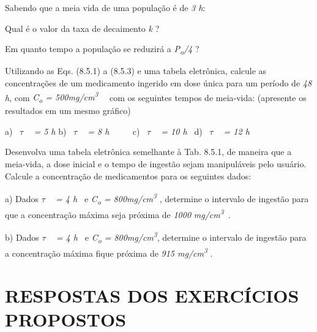 \begin{exercicios}
	\exitem{} Sabendo que a meia vida de uma população é de \textit{3 h}:

	\exitem{} Qual é o valor da taxa de decaimento \textit{k} ?

	\exitem{} Em quanto tempo a população se reduzirá a \textit{P\textsubscript{o}/4} ?


    \exitem{} Utilizando as Eqs. (8.5.1) a (8.5.3) e uma tabela eletrônica, calcule as concentrações de um medicamento ingerido em dose única para um período de \textit{48 h}, com \textit{C\textsubscript{o} = 500mg/cm\textsuperscript{3}}~~ com os seguintes tempos de meia-vida: (apresente os resultados em um mesmo gráfico)

    a)~ \textit{$ \tau$ ~ = 5 h} \quad \quad b)~ \textit{$ \tau$ ~ = 8 h~ \quad ~~~ }c)~ \textit{$ \tau$ ~ = 10 h~ \quad }d)~ \textit{$ \tau$ ~ = 12 h~ }

    \exitem{} Desenvolva uma tabela eletrônica semelhante à Tab. 8.5.1, de maneira que a meia-vida, a dose inicial e o tempo de ingestão sejam manipuláveis pelo usuário. Calcule a concentração de medicamentos para os seguintes dados:

    a) Dados \textit{$ \tau$ ~ = 4 h~ }e \textit{C\textsubscript{o} = 800mg/cm\textsuperscript{3 }}, determine o intervalo de ingestão para que a concentração máxima seja próxima de \textit{1000} \textit{mg/cm\textsuperscript{3}}~.~~~  

    b) Dados \textit{$ \tau$ ~ = 4 h~ }e \textit{C\textsubscript{o} = 800mg/cm\textsuperscript{3}}, determine o intervalo de ingestão para a concentração máxima fique próxima de \textit{915 mg/cm\textsuperscript{3}} .

\end{exercicios}

\section{RESPOSTAS DOS EXERCÍCIOS PROPOSTOS}

